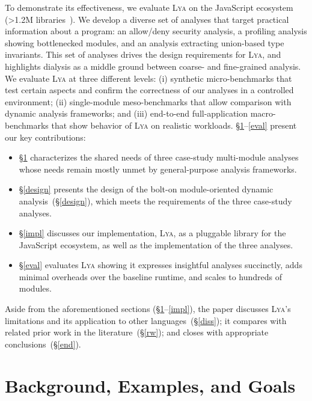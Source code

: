 \documentclass[letterpaper,twocolumn,10pt]{article}
\newcommand{\sx}[1]{(\S\ref{#1})}
\newcommand{\sys}{{\scshape Lya}\xspace}
\begin{document}
To demonstrate its effectiveness, we evaluate \sys on the JavaScript ecosystem (>1.2M libraries~\cite{modulecounts}). %
We develop a diverse set of analyses that target practical information about a program:
  an allow/deny security analysis,
  a profiling analysis showing bottlenecked modules,
  and an analysis extracting union-based type invariants.
This set of analyses drives the design requirements for \sys, and highlights dialysis as a middle ground between coarse- and fine-grained analysis.
We evaluate \sys at three different levels:
  (i) synthetic micro-benchmarks that test certain aspects and confirm the correctness of our analyses in a controlled environment;
  (ii) single-module meso-benchmarks that allow comparison with dynamic analysis frameworks; and
  (iii) end-to-end full-application macro-benchmarks that show behavior of \sys on realistic workloads. 
\S\ref{bg}--\ref{eval} present our key contributions:
\begin{itemize}
\item \S\ref{bg} characterizes the shared needs of three case-study multi-module analyses whose needs remain mostly unmet by general-purpose analysis frameworks.
\item \S\ref{design} presents the design of the bolt-on module-oriented dynamic analysis~\sx{design}, which meets the requirements of the three case-study analyses.
\item \S\ref{impl} discusses our implementation, \sys, as a pluggable library for the JavaScript ecosystem, as well as the implementation of the three analyses.
\item \S\ref{eval} evaluates \sys showing it expresses insightful analyses succinctly, adds minimal overheads over the baseline runtime, and scales to hundreds of modules.
\end{itemize}

Aside from the aforementioned sections (\S\ref{bg}--\ref{impl}), the paper discusses \sys's limitations and its application to other languages~\sx{diss};
  it compares with related prior work in the literature~\sx{rw};
  and closes with appropriate conclusions~\sx{end}.


\section{Background, Examples, and Goals}
\label{bg}
\end{document}
